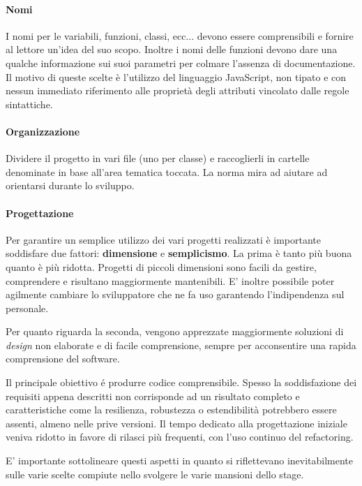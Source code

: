 \paragraph{Nomi}
I nomi per le variabili, funzioni, classi, ecc... devono essere comprensibili
e fornire al lettore un'idea del suo scopo. Inoltre i nomi delle funzioni
devono dare una qualche informazione sui suoi parametri per colmare l'assenza
di documentazione. Il motivo di queste scelte è l'utilizzo del linguaggio 
JavaScript, non tipato e con nessun immediato riferimento alle proprietà degli
attributi vincolato dalle regole sintattiche.

\paragraph{Organizzazione}
Dividere il progetto in vari file (uno per classe) e raccoglierli in cartelle
denominate in base all'area tematica toccata. La norma mira ad aiutare ad 
orientarsi durante lo sviluppo.

\paragraph{Progettazione}
Per garantire un semplice utilizzo dei vari progetti realizzati è importante
soddisfare due fattori: \textbf{dimensione} e \textbf{semplicismo}.
La prima è tanto più buona quanto è più ridotta. Progetti di piccoli dimensioni
sono facili da gestire, comprendere e risultano maggiormente mantenibili. E'
inoltre possibile poter agilmente cambiare lo sviluppatore che ne fa uso
garantendo l'indipendenza sul personale.

Per quanto riguarda la seconda, vengono apprezzate maggiormente soluzioni di
\textit{design} non elaborate e di facile comprensione, sempre per acconsentire
una rapida comprensione del software.

Il principale obiettivo é produrre codice comprensibile. Spesso la
soddisfazione dei requisiti appena descritti non corrisponde ad un risultato
completo e caratteristiche come la resilienza, robustezza o estendibilità
potrebbero essere assenti, almeno nelle prive versioni. Il tempo dedicato
alla progettazione iniziale veniva ridotto in favore di rilasci più frequenti,
con l'uso continuo del \gls{refactoring}.

E' importante sottolineare questi aspetti in quanto si riflettevano
inevitabilmente sulle varie scelte compiute nello svolgere le varie mansioni
dello stage.

